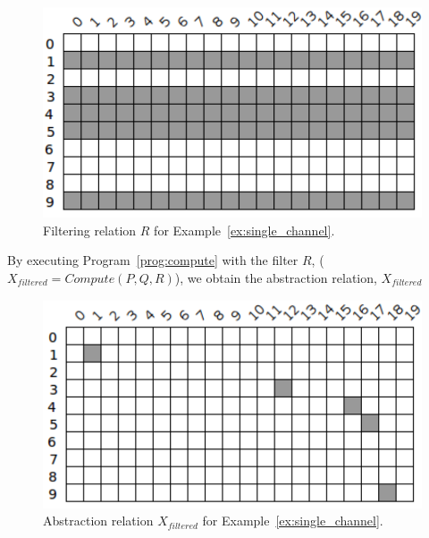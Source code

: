 \begin{example}
	\begin{figure}[ht]
		\centering
		\includegraphics[scale=0.65]{Figures/PDF/Relview/R.pdf}
		\caption{Filtering relation $R$ for Example~\ref{ex:single_channel}.}
		\label{fig:single_channel_r}
	\end{figure}
	
	By executing Program~\ref{prog:compute} with the filter $R$, ($X_{filtered} = Compute(P,Q,R)$), we obtain the abstraction relation, $X_{filtered}$ \newline
	\vspace{-0.25in}
	\begin{figure}[ht]
		\centering
		\includegraphics[scale=0.65]{Figures/PDF/Relview/XR.pdf}
		\caption{Abstraction relation $X_{filtered}$ for Example~\ref{ex:single_channel}.}
		\label{fig:single_channel_xr}
	\end{figure}
	 
\end{example}